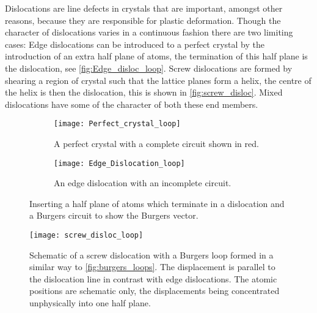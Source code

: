 

Dislocations are line defects in crystals that are important, amongst other reasons, because they are responsible for plastic deformation. Though the character of dislocations varies in a continuous fashion there are two limiting cases: Edge dislocations can be introduced to a perfect crystal by the introduction of an extra half plane of atoms, the termination of this half plane is the dislocation, see \autoref{fig:Edge_disloc_loop}. Screw dislocations are formed by shearing a region of crystal such that the lattice planes form a helix, the centre of the helix is then the dislocation, this is shown in \autoref{fig:screw_disloc}. Mixed dislocations have some of the character of both these end members.



\begin{figure}
\centering

\begin{subfigure}{0.4\textwidth}
\centering
\texttt{[image: Perfect\_crystal\_loop]}
\caption{A perfect crystal with a complete circuit shown in red.}
\end{subfigure}
\begin{subfigure}{0.4\textwidth}
\centering
\texttt{[image: Edge\_Dislocation\_loop]}
\caption{An edge dislocation with an incomplete circuit. \label{fig:Edge_disloc_loop}}
\end{subfigure}

\caption[A Burgers loop around an edge dislocation.]{Inserting a half plane of atoms which terminate in a dislocation and a Burgers circuit to show the Burgers vector. \label{fig:burgers_loops}}

\end{figure}

\begin{figure}
\centering
{}
\texttt{[image: screw\_disloc\_loop]}
\caption[A Burgers loop around a screw dislocation.]{Schematic of a screw dislocation with a Burgers loop formed in a similar way to \autoref{fig:burgers_loops}. The displacement is parallel to the dislocation line in contrast with edge dislocations. The atomic positions are schematic only, the displacements being concentrated unphysically into one half plane. \label{fig:screw_disloc}}
\end{figure}




